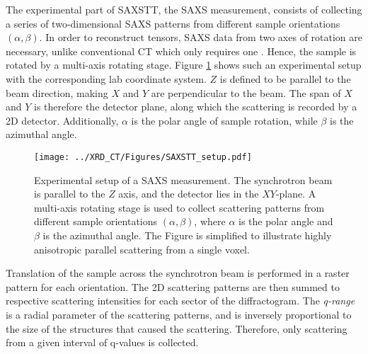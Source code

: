 The experimental part of SAXSTT, the SAXS measurement, consists of collecting a series of two-dimensional SAXS patterns from different sample orientations $\left(\alpha,\beta\right)$.
In order to reconstruct tensors, SAXS data from two axes of rotation are necessary, unlike conventional CT which only requires one \cite{liebi2018small}.
Hence, the sample is rotated by a multi-axis rotating stage.
Figure \ref{fig:SAXS_setup} shows such an experimental setup with the corresponding lab coordinate system.
$Z$ is defined to be parallel to the beam direction, making $X$ and $Y$ are perpendicular to the beam.
The span of $X$ and $Y$ is therefore the detector plane, along which the scattering is recorded by a 2D detector.
Additionally, $\alpha$ is the polar angle of sample rotation, while $\beta$ is the azimuthal angle.

\begin{figure}[h!]
    \centering
    \texttt{[image: ../XRD\_CT/Figures/SAXSTT\_setup.pdf]}
    \caption[Experimental Setup of SAXS]{Experimental setup of a SAXS measurement.
        The synchrotron beam is parallel to the $Z$ axis, and the detector lies in the $XY$-plane.
        A multi-axis rotating stage is used to collect scattering patterns from different sample orientations $\left(\alpha,\beta\right)$,
        where $\alpha$ is the polar angle and $\beta$ is the azimuthal angle.
        The Figure is simplified to illustrate highly anisotropic parallel scattering from a single voxel.
    }
    \label{fig:SAXS_setup}
\end{figure}

Translation of the sample across the synchrotron beam is performed in a raster pattern for each orientation.
The 2D scattering patterns are then summed to respective scattering intensities for each sector of the diffractogram.
The \emph{q-range} is a radial parameter of the scattering patterns, and is inversely proportional to the size of the structures that caused the scattering.
Therefore, only scattering from a given interval of q-values is collected. %





